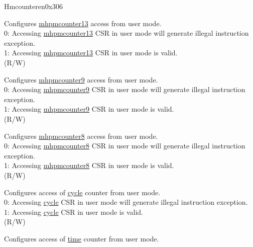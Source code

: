 \begin{register}{H}{mcounteren}{0x306}\label{regdesc:MCOUNTEREN}
%
%
%
%
%
%
%
%
%
\regnewline%
\begin{regdesc}\begin{reglist}
\label{fielddesc:MCOUNTEREN_HPM_13}\item [{HPM13}] Configures \hyperref[regdesc:MHPMCOUNTER13] {mhpmcounter13} access from user mode.\\
0: Accessing \hyperref[regdesc:MHPMCOUNTER13] {mhpmcounter13} CSR in user mode will generate illegal instruction exception. \\
1: Accessing \hyperref[regdesc:MHPMCOUNTER13] {mhpmcounter13} CSR in user mode is valid. \\
(R/W) 
\label{fielddesc:MCOUNTEREN_HPM9}\item [{HPM9}] Configures \hyperref[regdesc:MHPMCOUNTER9] {mhpmcounter9} access from user mode.\\
0: Accessing \hyperref[regdesc:MHPMCOUNTER9] {mhpmcounter9} CSR in user mode will generate illegal instruction exception. \\
1: Accessing \hyperref[regdesc:MHPMCOUNTER13] {mhpmcounter9} CSR in user mode is valid. \\
(R/W) 
\label{fielddesc:MCOUNTEREN_HPM_8}\item [{HPM8}] Configures \hyperref[regdesc:MHPMCOUNTER13] {mhpmcounter8} access from user mode.\\
0: Accessing \hyperref[regdesc:MHPMCOUNTER13] {mhpmcounter8} CSR in user mode will generate illegal instruction exception. \\
1: Accessing \hyperref[regdesc:MHPMCOUNTER8] {mhpmcounter8} CSR in user mode is valid. \\
(R/W) 
\label{fielddesc:MCOUNTEREN_CY}\item [CY] Configures access of \hyperref[regdesc:CYCLE]{cycle} counter from user mode. \\
0: Accessing \hyperref[regdesc:CYCLE]{cycle} CSR in user mode will generate illegal instruction exception. \\
1: Accessing \hyperref[regdesc:CYCLE]{cycle} CSR in user mode is valid. \\
(R/W) 
\label{fielddesc:MCOUNTEREN_TM}\item [TM] Configures access of \hyperref[regdesc:TIME]{time} counter from user mode. \\

\end{reglist}
\end{regdesc}
\end{register}
